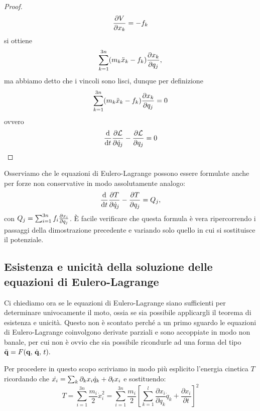 \begin{proof}
    \begin{equation}
        \frac{\partial V}{\partial x_k} = -f_k
    \end{equation}
    si ottiene
    \begin{equation}
        \sum_{k=1}^{3n}(m_k\ddot{x}_k - f_k)\frac{\partial x_k}{\partial q_j},
    \end{equation}
    ma abbiamo detto che i vincoli sono lisci, dunque per definizione
    \begin{equation}
        \sum_{k=1}^{3n}(m_k\ddot{x}_k - f_k)\frac{\partial x_k}{\partial q_j}=0
    \end{equation}
    ovvero
    \begin{equation}
        \frac{\mathrm{d}}{\mathrm{d}t} \frac{\partial \mathcal{L}}{\partial \dot{q}_j}-\frac{\partial \mathcal{L}}{\partial q_j}=0
    \end{equation}
    \end{proof}
    Osserviamo che le equazioni di Eulero-Lagrange possono essere formulate anche per forze non conservative in modo assolutamente analogo:
   \begin{equation}
       \frac{\mathrm{d}}{\mathrm{d}t} \frac{\partial T}{\partial \dot{q}_j} - \frac{\partial T}{\partial q_j} = Q_j,
   \end{equation}
   con $Q_j = \sum_{i=1}^{3n} f_i \frac{\partial x_i}{\partial q_j}$. È facile verificare che questa formula è vera ripercorrendo i passaggi della dimostrazione precedente e variando solo quello in cui si sostituisce il potenziale. 

   \subsection{Esistenza e unicità della soluzione delle equazioni di Eulero-Lagrange}
   Ci chiediamo ora se le equazioni di Eulero-Lagrange siano sufficienti per determinare univocamente il moto, ossia se sia possibile applicargli il teorema di esistenza e unicità. Questo non è scontato perché a un primo sguardo le equazioni di Eulero-Lagrange coinvolgono derivate parziali e sono accoppiate in modo non banale, per cui non è ovvio che sia possibile ricondurle ad una forma del tipo $\ddot{\mathbf{q}} = F(\mathbf{q},\,\dot{\mathbf{q}},\,t).$ 
   
   Per procedere in questo scopo scriviamo in modo più esplicito l'energia cinetica $T$ ricordando che $\dot{x_i} = \sum_k \partial_kx_i \dot{q}_k + \partial_t x_i$ e sostituendo:   
    \begin{equation}
        T = \sum_{i=1}^{3n} \frac{m_i}{2} \dot{x}_i^2 = \sum_{i=1}^{3n} \frac{m_i}{2} \left[\sum_{k=1}^l \frac{\partial x_i}{\partial q_k}\dot{q}_k + \frac{\partial x_i}{\partial t}\right]^2
        \label{T 1}
    \end{equation}
    
